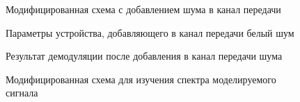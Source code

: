 \documentclass[a4paper,14pt]{extarticle}
\begin{document}
\begin{figure}[H]
\caption{Модифицированная схема с добавлением шума в канал передачи}
\label{007}
\end{figure}

\begin{figure}[H]
\caption{Параметры устройства, добавляющего в канал передачи белый шум}
\label{008}
\end{figure}

\begin{figure}[H]
\caption{Результат демодуляции после добавления в канал передачи шума}
\label{009}
\end{figure}

\begin{figure}[H]
\caption{Модифицированная схема для изучения спектра моделируемого сигнала}
\label{010}
\end{figure}
\end{document}
